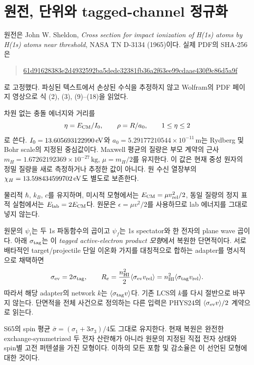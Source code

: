 \documentclass[11pt,a4paper]{article}
\numberwithin{equation}{section}
\begin{document}
\newpage
\section{원전, 단위와 tagged-channel 정규화}
원전은 John W. Sheldon, \emph{Cross section for impact ionization of H(1s) atoms by H(1s) atoms near threshold}, NASA TN D-3134 (1965)이다\cite{sheldon}. 실제 PDF의 SHA-256은
\begin{quote}\small\ttfamily\url{61d91628383e2d4932592ba5dedc32381fb36a2f63ee99cdaae430f9c86d5a9f}\end{quote}
로 고정했다. 파싱된 텍스트에서 손상된 수식을 추정하지 않고 Wolfram의 PDF 페이지 영상으로 식 (2), (3), (9)--(18)을 읽었다.

차원 없는 충돌 에너지와 거리를
\begin{equation}
\eta=E_{\mathrm{CM}}/I_0,\qquad \rho=R/a_0,\qquad 1\le\eta\le2
\end{equation}
로 쓴다. $I_0=13.605693122990\,\mathrm{eV}$와 $a_0=5.29177210544\times10^{-11}\,\mathrm m$는 Rydberg 및 Bohr scale의 지정된 중심값이다\cite{codata}. Maxwell 평균의 질량은 부모 계약의 근사 $m_H=1.67262192369\times10^{-27}\,\mathrm{kg}$, $\mu=m_H/2$를 유지한다. 이 값은 현재 중성 원자의 정밀 질량을 새로 측정하거나 추정한 값이 아니다. 원 수신 열장부의 $\chi_H=13.598434599702\,\mathrm{eV}$도 별도로 보존한다.

물리적 $\hbar$, $k_B$, $c$를 유지하며, 미시적 모형에서는 $E_{\mathrm{CM}}=\mu v_{\rm rel}^2/2$, 동일 질량의 정지 표적 실험에서는 $E_{\mathrm{lab}}=2E_{\mathrm{CM}}$다. 원문은 $\epsilon=\mu v^2/2$를 사용하므로 lab 에너지를 그대로 넣지 않는다.

원문의 $\psi_i$는 두 1s 파동함수의 곱이고 $\psi_f$는 1s spectator와 한 전자의 plane wave 곱이다. 아래 $\sigma_{\rm tag}$는 이 \emph{tagged active-electron product 모형}에서 복원한 단면적이다. 서로 배타적인 target/projectile 단일 이온화 가지를 대칭적으로 합하는 adapter를 명시적으로 채택하면
\begin{equation}
\sigma_{\rm ev}=2\sigma_{\rm tag},\qquad
R_e=\frac{n_{\rm HI}^2}{2}\langle\sigma_{\rm ev}v_{\rm rel}\rangle
=n_{\rm HI}^2\langle\sigma_{\rm tag}v_{\rm rel}\rangle .
\end{equation}
따라서 해당 adapter의 network $k$는 $\langle\sigma_{\rm tag}v\rangle$다. 기존 LCS의 $k$를 다시 절반으로 바꾸지 않는다. 단면적을 전체 사건으로 정의하는 다른 입력은 PHYS24의 $\langle\sigma_{\rm ev}v\rangle/2$ 계약으로 읽는다.

S65의 spin 평균 $\bar\sigma=(\sigma_1+3\sigma_3)/4$도 그대로 유지한다. 현재 복원은 완전한 exchange-symmetrized 두 전자 산란해가 아니라 원문의 지정된 직접 전자 상태와 spin별 고전 퍼텐셜을 가진 모형이다. 이하의 모든 포함 및 감소율은 이 선언된 모형에 대한 것이다.
\end{document}

